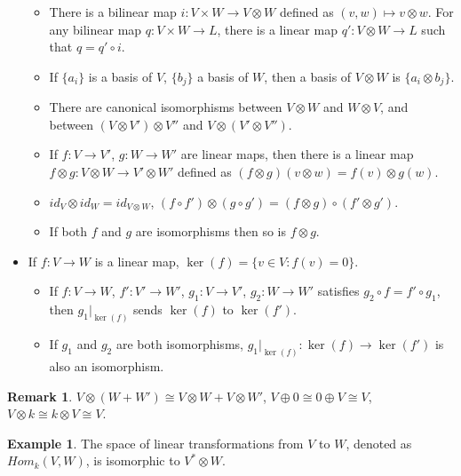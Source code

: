 \documentclass{article}
\theoremstyle{definition}
\newtheorem{rmk}[thm]{Remark}
\newtheorem{exm}[thm]{Example}
\begin{document}
\begin{itemize}
    \begin{itemize}
        \item There is a bilinear map $i: V\times W\rightarrow V\otimes W$ defined as $(v, w)\mapsto v\otimes w$. For any bilinear map $q: V\times W\rightarrow L$, there is a linear map $q': V\otimes W\rightarrow L$ such that $q=q'\circ i$. 
        \item If $\{a_i\}$ is a basis of $V$, $\{b_j\}$ a basis of $W$, then a basis of $V\otimes W$ is $\{a_i\otimes b_j\}$.
        \item There are canonical isomorphisms between $V\otimes W$ and $W\otimes V$, and between $(V\otimes V')\otimes V''$ and $V\otimes(V'\otimes V'')$.
        \item If $f: V\rightarrow V'$, $g: W\rightarrow W'$ are linear maps, then there is a linear map $f\otimes g: V\otimes W\rightarrow V'\otimes W'$ defined as $(f\otimes g)(v\otimes w)=f(v)\otimes g(w)$. 
        \item $id_V\otimes id_W=id_{V\otimes W}$, $(f\circ f')\otimes (g\circ g')=(f\otimes g)\circ (f'\otimes g')$.
        \item If both $f$ and $g$ are isomorphisms then so is $f\otimes g$.
    \end{itemize}
    \item If $f: V\rightarrow W$ is a linear map, $\ker(f)=\{v\in V: f(v)=0\}$.
    \begin{itemize}
        \item If $f: V\rightarrow W$, $f': V'\rightarrow W'$, $g_1: V\rightarrow V'$, $g_2: W\rightarrow W'$ satisfies $g_2\circ f=f'\circ g_1$, then $g_1|_{\ker(f)}$ sends $\ker(f)$ to $\ker(f')$.
        \item If $g_1$ and $g_2$ are both isomorphisms, $g_1|_{\ker(f)}: \ker(f)\rightarrow \ker(f')$ is also an isomorphism.
    \end{itemize}
\end{itemize}

\begin{rmk}
    $V\otimes(W+W')\cong V\otimes W+V\otimes W'$, $V\oplus 0\cong 0\oplus V\cong V$, $V\otimes k\cong k\otimes V\cong V$.
\end{rmk}

\begin{exm}
    The space of linear transformations from $V$ to $W$, denoted as $Hom_k(V, W)$, is isomorphic to $V^*\otimes W$.
\end{exm}
\end{document}

